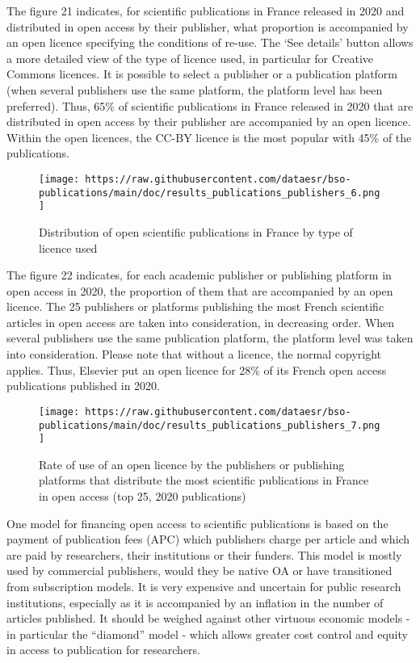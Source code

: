 \documentclass[
]{article}
\begin{document}
The figure 21 indicates, for scientific publications in France released
in 2020 and distributed in open access by their publisher, what
proportion is accompanied by an open licence specifying the conditions
of re-use. The `See details' button allows a more detailed view of the
type of licence used, in particular for Creative Commons licences. It is
possible to select a publisher or a publication platform (when several
publishers use the same platform, the platform level has been
preferred). Thus, 65\% of scientific publications in France released in
2020 that are distributed in open access by their publisher are
accompanied by an open licence. Within the open licences, the CC-BY
licence is the most popular with 45\% of the publications.

\begin{figure}
\centering
\texttt{[image: https://raw.githubusercontent.com/dataesr/bso-publications/main/doc/results\_publications\_publishers\_6.png]}
\caption{Distribution of open scientific publications in France by type
of licence used}
\end{figure}

The figure 22 indicates, for each academic publisher or publishing
platform in open access in 2020, the proportion of them that are
accompanied by an open licence. The 25 publishers or platforms
publishing the most French scientific articles in open access are taken
into consideration, in decreasing order. When several publishers use the
same publication platform, the platform level was taken into
consideration. Please note that without a licence, the normal copyright
applies. Thus, Elsevier put an open licence for 28\% of its French open
access publications published in 2020.

\begin{figure}
\centering
\texttt{[image: https://raw.githubusercontent.com/dataesr/bso-publications/main/doc/results\_publications\_publishers\_7.png]}
\caption{Rate of use of an open licence by the publishers or publishing
platforms that distribute the most scientific publications in France in
open access (top 25, 2020 publications)}
\end{figure}

One model for financing open access to scientific publications is based
on the payment of publication fees (APC) which publishers charge per
article and which are paid by researchers, their institutions or their
funders. This model is mostly used by commercial publishers, would they
be native OA or have transitioned from subscription models. It is very
expensive and uncertain for public research institutions, especially as
it is accompanied by an inflation in the number of articles published.
It should be weighed against other virtuous economic models - in
particular the ``diamond'' model - which allows greater cost control and
equity in access to publication for researchers.
\end{document}

